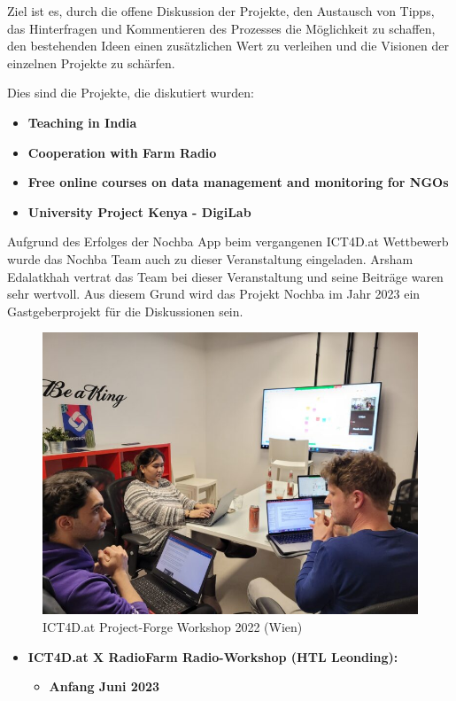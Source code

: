 Ziel ist es, durch die offene Diskussion der Projekte, den Austausch von Tipps, das Hinterfragen und Kommentieren des Prozesses die Möglichkeit zu schaffen, den bestehenden Ideen einen zusätzlichen Wert zu verleihen und die Visionen der einzelnen Projekte zu schärfen.

Dies sind die Projekte, die diskutiert wurden:

\begin{itemize}
    \item \textbf{Teaching in India}
    \item \textbf{Cooperation with Farm Radio}
    \item \textbf{Free online courses on data management and monitoring for NGOs}
    \item \textbf{University Project Kenya - DigiLab}
\end{itemize}

Aufgrund des Erfolges der Nochba App beim vergangenen ICT4D.at Wettbewerb wurde das Nochba Team auch zu dieser Veranstaltung eingeladen. Arsham Edalatkhah vertrat das Team bei dieser Veranstaltung und seine Beiträge waren sehr wertvoll. Aus diesem Grund wird das Projekt Nochba im Jahr 2023 ein Gastgeberprojekt für die Diskussionen sein.

\begin{figure}[H]
    \centering
    \includegraphics[width=1\textwidth]{pics/Project-forge-01.jpg}
    \caption{ICT4D.at Project-Forge Workshop 2022 (Wien)}
    \label{fig:Project-Forge-Workshop-2022}
\end{figure}

\begin{itemize}
    \item \textbf{ICT4D.at X RadioFarm Radio-Workshop (HTL Leonding):}
          \begin{itemize}
              \item \textbf{Anfang Juni 2023}
          \end{itemize}
\end{itemize}


